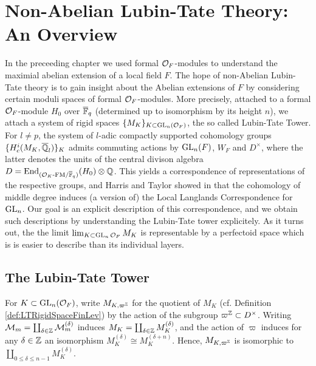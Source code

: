 \documentclass[../main.tex]{subfiles}
\begin{document}
\section{Non-Abelian Lubin-Tate Theory: An Overview} %
\label{sec:Non-Abelian Lubin-Tate Theory: An Overview}
In the preceeding chapter we used formal $\mathcal{O}_F$-modules to understand the 
maximial abelian extension of a local field $F$. The hope of non-Abelian Lubin-Tate
theory is to gain insight about the Abelian extensions of $F$ by considering
certain moduli spaces of formal $\mathcal{O}_F$-modules.
More precisely, attached to a formal $\mathcal{O}_F$-module $H_0$ over ${\overline {\mathbb{F}}_q}$ (determined
up to isomorphism by its height $n$), we attach a system of rigid spaces 
$\{M_K\}_{K \subset \operatorname{GL}_n(\mathcal{O}_F)}$, the so called Lubin-Tate Tower. For $l \neq p$, 
the system of $l$-adic compactly supported cohomology groups $\{H_c^{i}(M_K,
\overline {\mathbb{Q}}_l)\}_K$ admits commuting actions by $\operatorname{GL}_n(F)$, $W_F$ and $D^\times$,
where the latter denotes the units of the central divison algebra $D =
\operatorname{End}_{{({\mathcal{O}_K}\text-\allowbreak\mathrm{FM}/{{\overline {\mathbb{F}}_q}})}}(H_0) \otimes \mathbb{Q}$. This yields a correspondence of 
representations of the respective groups, and Harris and Taylor showed in
\cite{HTShimura} that the cohomology of middle degree induces (a version of)
the Local Langlands Correspondence for $\operatorname{GL}_n$. Our goal is an explicit
description of this correspondence, and we obtain such descriptions by
understanding the Lubin-Tate tower explicitely.
As it turns out, the the limit $\lim_{K\subset \operatorname{GL}_n{\mathcal{O}_F}} M_K$ is
representable by a perfectoid space
which is is easier to describe than its individual layers.

\subsection{The Lubin-Tate Tower} %
\label{sub:The Lubin-Tate Tower}


\begin{defi}\label{def:LTRigidSpaceFinLev}
  \todo{}
\end{defi}

For $K \subset \operatorname{GL}_n(\mathcal{O}_F)$, write $M_{K, \varpi^{\mathbb{Z}}}$ for the quotient of 
$M_K$ (cf. Definition \ref{def:LTRigidSpaceFinLev}) by the action of the subgroup
$\varpi^{\mathbb{Z}} \subset D^\times$. Writing $\mathcal{M}_m = \coprod_{\delta \in \mathbb{Z}} \mathcal{M}_m^{(\delta)}$
induces $M_K = \coprod_{\delta \in\mathbb{Z}} M_K^{(\delta)}$, and 
the action of $\varpi$ induces for any $\delta \in \mathbb{Z}$ an isomorphism 
$M_K^{(\delta)} \cong M_K^{(\delta +n)}$. Hence, $M_{K, \varpi^{\mathbb{Z}}}$ is 
isomorphic to $\coprod_{0 \leq \delta \leq n-1} M_{K}^{(\delta)}$. 
\end{document}
